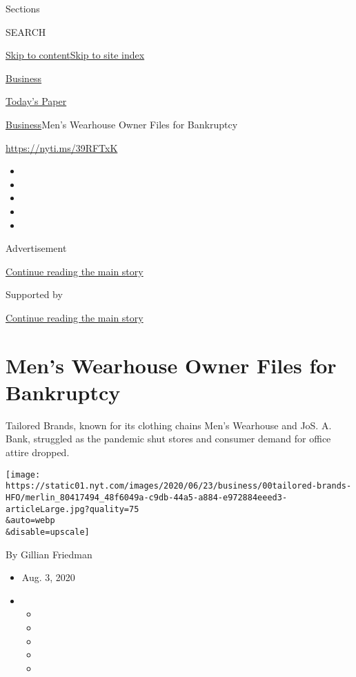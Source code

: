 Sections

SEARCH

\protect\hyperlink{site-content}{Skip to
content}\protect\hyperlink{site-index}{Skip to site index}

\href{https://www.nytimes.com/section/business}{Business}

\href{https://myaccount.nytimes.com/auth/login?response_type=cookie\&client_id=vi}{}

\href{https://www.nytimes.com/section/todayspaper}{Today's Paper}

\href{/section/business}{Business}\textbar{}Men's Wearhouse Owner Files
for Bankruptcy

\url{https://nyti.ms/39RFTxK}

\begin{itemize}
\item
\item
\item
\item
\item
\end{itemize}

Advertisement

\protect\hyperlink{after-top}{Continue reading the main story}

Supported by

\protect\hyperlink{after-sponsor}{Continue reading the main story}

\hypertarget{mens-wearhouse-owner-files-for-bankruptcy}{%
\section{Men's Wearhouse Owner Files for
Bankruptcy}\label{mens-wearhouse-owner-files-for-bankruptcy}}

Tailored Brands, known for its clothing chains Men's Wearhouse and JoS.
A. Bank, struggled as the pandemic shut stores and consumer demand for
office attire dropped.

\texttt{[image: https://static01.nyt.com/images/2020/06/23/business/00tailored-brands-HFO/merlin\_80417494\_48f6049a-c9db-44a5-a884-e972884eeed3-articleLarge.jpg?quality=75\\\&auto=webp\\\&disable=upscale]}

By Gillian Friedman

\begin{itemize}
\item
  Aug. 3, 2020
\item
  \begin{itemize}
  \item
  \item
  \item
  \item
  \item
  \end{itemize}
\end{itemize}

